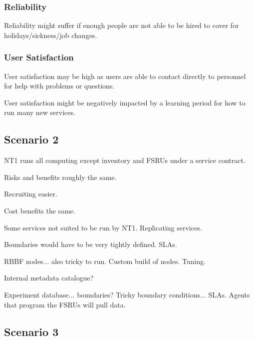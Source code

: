 \documentclass[12pt,a4paper]{article}
\begin{document}
\subsubsection{Reliability}
\bitm
\item Reliability might suffer if enough people are not able to be hired to cover for holidays/sickness/job changes.
\eitm

\subsubsection{User Satisfaction}
\bitm
\item User satisfaction may be high as users are able to contact directly to \EC personnel for help with problems or questions.
\item User satisfaction might be negatively impacted by a learning period for how to run many new services.
\eitm


\subsection{Scenario 2}
\label{ssec:scen2}
NT1 runs all computing except inventory and FSRUs under a service contract.




Risks and benefits roughly the same.

Recruiting easier.

Cost benefits the same.

Some services not suited to be run by NT1. Replicating services.

Boundaries would have to be very tightly defined. SLAs.

RBBF nodes... also tricky to run. Custom build of nodes. Tuning.

Internal metadata catalogue?

Experiment database... boundaries? Tricky boundary conditions... SLAs. Agents that program the FSRUs will pull data. 

\subsection{Scenario 3}
\label{ssec:scen3}
\end{document}
